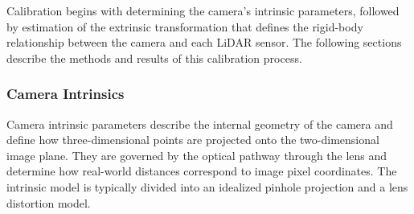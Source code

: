\documentclass{erauthesis}
\begin{document}
Calibration begins with determining the camera’s intrinsic parameters, followed by estimation of the extrinsic transformation that defines the rigid-body relationship between the camera and each \ac{LiDAR} sensor.  
The following sections describe the methods and results of this calibration process.

% 


% 



\subsubsection{Camera Intrinsics} \label{camera_intrinsics}

Camera intrinsic parameters describe the internal geometry of the camera and define how three-dimensional points are projected onto the two-dimensional image plane.  
They are governed by the optical pathway through the lens and determine how real-world distances correspond to image pixel coordinates.  
The intrinsic model is typically divided into an idealized pinhole projection and a lens distortion model.
\end{document}
